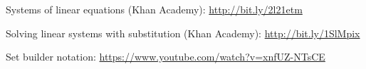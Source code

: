 \begin{readinessAssuranceResources}
\item Systems of linear equations (Khan Academy):
      \url{http://bit.ly/2l21etm}
\item Solving linear systems with substitution (Khan Academy):
      \url{http://bit.ly/1SlMpix}
\item Set builder notation: 
		\url{https://www.youtube.com/watch?v=xnfUZ-NTsCE}
\end{readinessAssuranceResources}
